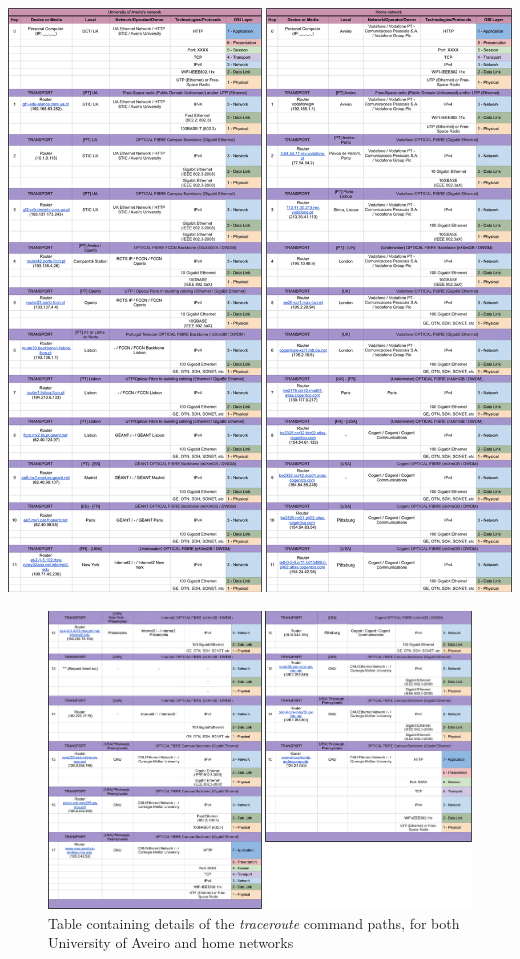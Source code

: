 \documentclass{article}
\begin{document}
\vspace*{\fill}
    \begin{center}
        \includegraphics[width=1 \textwidth]{images/traceroute_part1.png}
    \end{center}
\vspace*{\fill}

\vspace*{\fill}
    \begin{figure}[t]
        \includegraphics[width=1 \textwidth]{images/traceroute_part2.png}
        \caption{Table containing details of the \textit{traceroute} command paths, for both University of Aveiro and home networks}
    \end{figure}
\vspace*{\fill}
\end{document}
